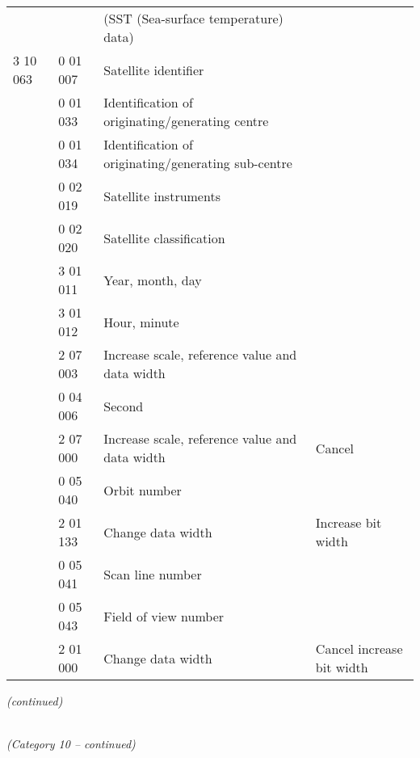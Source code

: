 \begin{longtable}[]{@{}llll@{}}
& & (SST (Sea-surface temperature) data) &\tabularnewline
3 10 063 & 0 01 007 & Satellite identifier &\tabularnewline
& 0 01 033 & Identification of originating/generating centre &\tabularnewline
& 0 01 034 & Identification of originating/generating sub-centre &\tabularnewline
& 0 02 019 & Satellite instruments &\tabularnewline
& 0 02 020 & Satellite classification &\tabularnewline
& 3 01 011 & Year, month, day &\tabularnewline
& 3 01 012 & Hour, minute &\tabularnewline
& 2 07 003 & Increase scale, reference value and data width &\tabularnewline
& 0 04 006 & Second &\tabularnewline
& 2 07 000 & Increase scale, reference value and data width & Cancel\tabularnewline
& 0 05 040 & Orbit number &\tabularnewline
& 2 01 133 & Change data width & Increase bit width\tabularnewline
& 0 05 041 & Scan line number &\tabularnewline
& 0 05 043 & Field of view number &\tabularnewline
& 2 01 000 & Change data width & Cancel increase bit width\tabularnewline
\bottomrule
\end{longtable}

\emph{(continued)}

\emph{\\
(Category 10 -- continued)}

